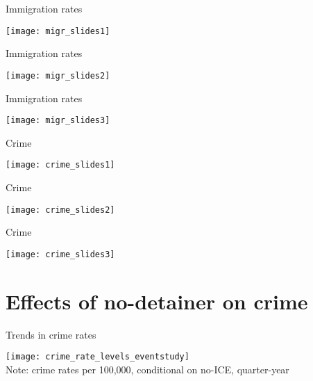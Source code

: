 \documentclass[xcolor=pdftex,dvipsnames,table,handout]{beamer}
\begin{document}
\begin{frame}{Immigration rates}
\begin{center}
\texttt{[image: migr\_slides1]}
\end{center}
\end{frame}

\begin{frame}{Immigration rates}
\begin{center}
\texttt{[image: migr\_slides2]}
\end{center}
\end{frame}

\begin{frame}{Immigration rates}
\begin{center}
\texttt{[image: migr\_slides3]}
\end{center}
\end{frame}

\begin{frame}{Crime}
\begin{center}
\texttt{[image: crime\_slides1]}
\end{center}
\end{frame}

\begin{frame}{Crime}
\begin{center}
\texttt{[image: crime\_slides2]}
\end{center}
\end{frame}

\begin{frame}{Crime}
\begin{center}
\texttt{[image: crime\_slides3]}
\end{center}
\end{frame}

\section{Effects of no-detainer on crime}
\begin{frame}{Trends in crime rates}
\begin{center}
\texttt{[image: crime\_rate\_levels\_eventstudy]}\\
\footnotesize{Note: crime rates per 100,000, conditional on no-ICE, quarter-year}
\end{center}
\end{frame}
\end{document}
